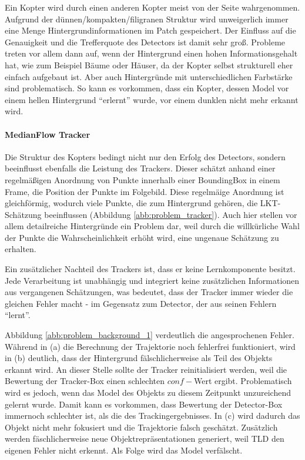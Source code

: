 	Ein Kopter wird durch einen anderen Kopter meist von der Seite wahrgenommen. Aufgrund der dünnen/kompakten/filigranen Struktur wird unweigerlich immer eine Menge Hintergrundinformationen im Patch gespeichert. Der Einfluss auf die Genauigkeit und die Trefferquote des Detectors ist damit sehr groß. Probleme treten vor allem dann auf, wenn der Hintergrund einen hohen Informationsgehalt hat, wie zum Beispiel Bäume oder Häuser, da der Kopter selbst strukturell eher einfach aufgebaut ist. Aber auch Hintergründe mit unterschiedlichen Farbstärke sind problematisch. So kann es vorkommen, dass ein Kopter, dessen Model vor einem hellen Hintergrund ``erlernt'' wurde, vor einem dunklen nicht mehr erkannt wird. 

	
	\paragraph{MedianFlow Tracker}
	Die Struktur des Kopters bedingt nicht nur den Erfolg des Detectors, sondern beeinflusst ebenfalls die Leistung des Trackers. Dieser schätzt anhand einer regelmäßigen Anordnung von Punkte innerhalb einer BoundingBox in einem Frame, die Position der Punkte im Folgebild. Diese regelmäige Anordnung ist gleichförmig, wodurch viele Punkte, die zum Hintergrund gehören, die LKT-Schätzung beeinflussen (Abbildung \ref{abb:problem_tracker}). Auch hier stellen vor allem detailreiche Hintergründe ein Problem dar, weil durch die willkürliche Wahl der Punkte die Wahrscheinlichkeit erhöht wird, eine ungenaue Schätzung zu erhalten.

	Ein zusätzlicher Nachteil des Trackers ist, dass er keine Lernkomponente besitzt. Jede Verarbeitung ist unabhängig und integriert keine zusätzlichen Informationen aus vergangenen Schätzungen, was bedeutet, dass der Tracker immer wieder die gleichen Fehler macht - im Gegensatz zum Detector, der aus seinen Fehlern ``lernt''. 

	Abbildung \ref{abb:problem_background_1} verdeutlich die angesprochenen Fehler. Während in (a) die Berechnung der Trajektorie noch fehlerfrei funktioniert, wird in (b) deutlich, dass der Hintergrund fälschlicherweise als Teil des Objekts erkannt wird. An dieser Stelle sollte der Tracker reinitialisiert werden, weil die Bewertung der Tracker-Box einen schlechten $conf-$Wert ergibt. Problematisch wird es jedoch, wenn das Model des Objekts zu diesem Zeitpunkt unzureichend gelernt wurde. Damit kann es vorkommen, dass Bewertung der Detector-Box immernoch schlechter ist, als die des Trackingergebnisses. In (c) wird dadurch das Objekt nicht mehr fokusiert und die Trajektorie falsch geschätzt. Zusätzlich werden fäschlicherweise neue Objektrepräsentationen generiert, weil TLD den eigenen Fehler nicht erkennt. Als Folge wird das Model verfälscht.

